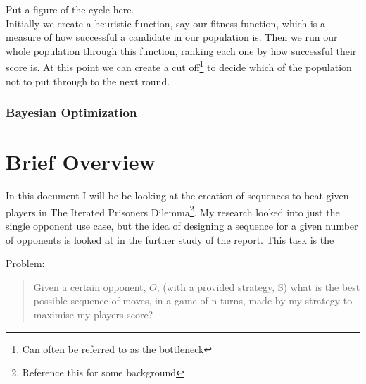 Put a figure of the cycle here.\label{fig:geneticAlgoCycle} \\

Initially we create a heuristic function, say our fitness function, which is a measure of how successful a candidate in our population is.
Then we run our whole population through this function, ranking each one by how successful their score is.
At this point we can create a cut off\footnote{Can often be referred to as the bottleneck} to decide which of the population not to put through to the next round.\\

\subsubsection{Bayesian Optimization}

\section{Brief Overview}\label{sec:briefOverview}
In this document I will be be looking at the creation of sequences to beat given players in The Iterated Prisoners Dilemma\footnote{Reference this for some background}.
My research looked into just the single opponent use case, but the idea of designing a sequence for a given number of opponents is looked at in the further study of the report.
This task is the


Problem:\\
\begin{quotation}
    Given a certain opponent, \(O\), (with a provided strategy, S) what is the best possible sequence of moves, in a game of n turns, made by my strategy to maximise my players score?
\end{quotation}

